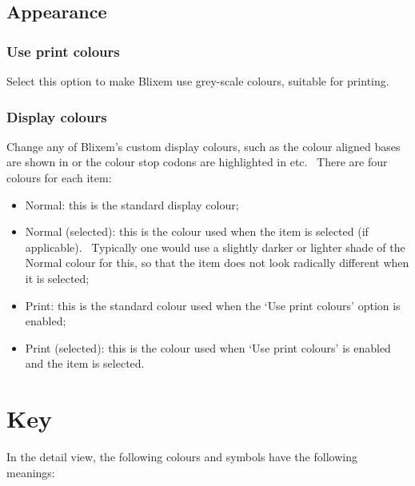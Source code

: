 \documentclass[letterpaper]{article}
\newcommand\liststyleWWviiiNumxx{%
\renewcommand\labelitemi{{\textbullet}}
\renewcommand\labelitemii{o}
\renewcommand\labelitemiii{[F0A7?]}
\renewcommand\labelitemiv{[F0B7?]}
}
\begin{document}
\bigskip

{\color[rgb]{0.30980393,0.5058824,0.7411765}\subsection[Appearance]{Appearance}}
\hypertarget{RefHeading2621056909880}{}
{\color[rgb]{0.30980393,0.5058824,0.7411765}\subsubsection[Use print
colours]{Use print colours}}
\hypertarget{RefHeading2641056909880}{}{
Select this option to make Blixem use grey-scale colours, suitable for
printing.}

\bigskip

{\color[rgb]{0.30980393,0.5058824,0.7411765}\subsubsection[Display colours]{Display colours}}
\hypertarget{RefHeading2661056909880}{}{
Change any of Blixem{\textquoteright}s custom display colours, such as
the colour aligned bases are shown in or the colour stop codons are
highlighted in etc. \ There are four colours for each item: }

\liststyleWWviiiNumxx
\begin{itemize}
\item {
Normal: this is the standard display colour;}
\item {
Normal (selected): this is the colour used when the item is selected (if
applicable). \ Typically one would use a slightly darker or lighter
shade of the Normal colour for this, so that the item does not look
radically different when it is selected;}
\item {
Print: this is the standard colour used when the {\textquoteleft}Use
print colours{\textquoteright} option is enabled;}
\item {
Print (selected): this is the colour used when {\textquoteleft}Use print
colours{\textquoteright} is enabled and the item is selected. }
\end{itemize}

{\color[rgb]{0.0,0.27058825,0.5254902}\section[Key]{Key}}
\hypertarget{RefHeading2681056909880}{}{
In the detail view, the following colours and symbols have the following
meanings:}
\end{document}

